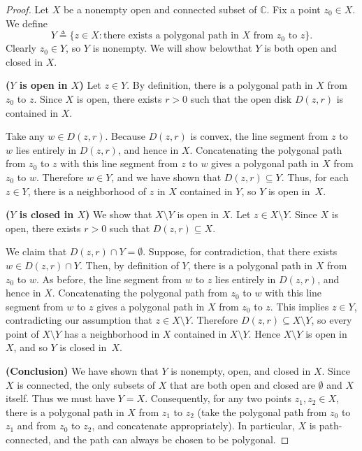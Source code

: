 \begin{proof}
	Let $X$ be a nonempty open and connected subset of $\mathbb{C}$. Fix a point $z_0 \in X$.
	We define
	\[
	Y \triangleq \{ z \in X : \text{there exists a polygonal path in $X$ from $z_0$ to $z$} \}.
	\]
	Clearly $z_0 \in Y$, so $Y$ is nonempty. We will show belowthat $Y$ is both open and closed in $X$.
	
	\smallskip
	
	\noindent\textbf{($Y$ is open in $X$)}
	Let $z \in Y$. By definition, there is a polygonal path in $X$ from $z_0$ to $z$. Since $X$ is
	open, there exists $r>0$ such that the open disk $D(z,r)$ is contained in $X$.
	
	Take any $w \in D(z,r)$. Because $D(z,r)$ is convex, the line segment from $z$ to $w$ lies
	entirely in $D(z,r)$, and hence in $X$. Concatenating the polygonal path from $z_0$ to $z$
	with this line segment from $z$ to $w$ gives a polygonal path in $X$ from $z_0$ to $w$.
	Therefore $w \in Y$, and we have shown that $D(z,r) \subseteq Y$.
	Thus, for each $z \in Y$, there is a neighborhood of $z$ in $X$ contained in $Y$, so $Y$ is open in~$X$.
	
	\smallskip
	
	\noindent\textbf{($Y$ is closed in $X$)}
	We show that $X \setminus Y$ is open in $X$. Let $z \in X \setminus Y$. Since $X$ is open,
	there exists $r>0$ such that $D(z,r) \subseteq X$.
	
	We claim that $D(z,r) \cap Y = \emptyset$. Suppose, for contradiction, that there exists
	$w \in D(z,r) \cap Y$. Then, by definition of $Y$, there is a polygonal path in $X$ from
	$z_0$ to $w$. As before, the line segment from $w$ to $z$ lies entirely in $D(z,r)$, and hence
	in $X$. Concatenating the polygonal path from $z_0$ to $w$ with this line segment from $w$ to
	$z$ gives a polygonal path in $X$ from $z_0$ to $z$. This implies $z \in Y$, contradicting
	our assumption that $z \in X \setminus Y$.
	Therefore $D(z,r) \subseteq X \setminus Y$, so every point of $X \setminus Y$ has a
	neighborhood in $X$ contained in $X \setminus Y$. Hence $X \setminus Y$ is open in $X$, and
	so $Y$ is closed in~$X$.
	
	\smallskip
	
	\noindent\textbf{(Conclusion)}
	We have shown that $Y$ is nonempty, open, and closed in $X$. Since $X$ is connected, the only
	subsets of $X$ that are both open and closed are $\emptyset$ and $X$ itself. Thus we must have
	$Y = X$. Consequently, for any two points $z_1, z_2 \in X$, there is a polygonal path in $X$ from
	$z_1$ to $z_2$ (take the polygonal path from $z_0$ to $z_1$ and from $z_0$ to $z_2$, and
	concatenate appropriately). In particular, $X$ is path-connected, and the path can always be
	chosen to be polygonal.
\end{proof}


